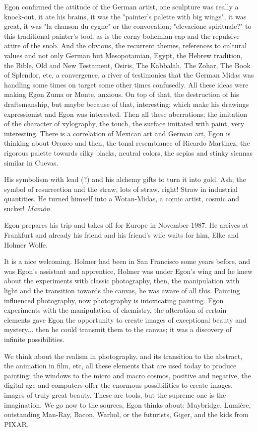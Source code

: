 \documentclass[smalldemyvopaper,11pt,twoside,onecolumn,openright,extrafontsizes]{memoir}
\begin{document}
Egon confirmed the attitude of the German artist, one sculpture was really a knock-out, it ate his brains, it was the "painter’s palette with big wings", it was great, it was "la chanson du cygne" or the convocation; "elevacione spirituale?" to this traditional painter’s tool, as is the corny bohemian cap and the repulsive attire of the snob. And the obvious, the recurrent themes, references to cultural values and not only German but Mesopotamian, Egypt, the Hebrew tradition, the Bible, Old and New Testament, Osiris, The Kabbalah, The Zohar, The Book of Splendor, etc, a convergence, a river of testimonies that the German Midas was handling some times on target some other times confusedly. All these ideas were making Egon Zuma or Monte, anxious. On top of that, the destruction of his draftsmanship, but maybe because of that, interesting; which make his drawings expressionist and Egon was interested. Then all these aberrations; the imitation of the character of xylography, the touch, the surface imitated with paint, very interesting. There is a correlation of Mexican art and German art, Egon is thinking about Orozco and then, the tonal resemblance of Ricardo Martinez, the rigorous palette towards silky blacks, neutral colors, the sepias and stinky siennas similar in Cuevas.

His symbolism with lead (?) and his alchemy gifts to turn it into gold. Ash; the symbol of resurrection and the straw, lots of straw, right! Straw in industrial quantities. He turned himself into a Wotan-Midas, a comic artist, cosmic and sucker! \textit{Mamón}.

Egon prepares his trip and takes off for Europe in November 1987. He arrives at Frankfurt and already his friend and his friend’s wife waits for him, Elke and Holmer Wolfe.

It is a nice welcoming. Holmer had been in San Francisco some years before, and was Egon’s assistant and apprentice, Holmer was under Egon’s wing and he knew about the experiments with classic photography, then, the manipulation with light and the transition towards the canvas, he was aware of all this. Painting influenced photography, now photography is intoxicating painting. Egon experiments with the manipulation of chemistry, the alteration of certain elements gave Egon the opportunity to create images of exceptional beauty and mystery... then he could transmit them to the canvas; it was a discovery of infinite possibilities.

We think about the realism in photography, and its transition to the abstract, the animation in film, etc, all these elements that are used today to produce painting: the windows to the micro and macro cosmos, positive and negative, the digital age and computers offer the enormous possibilities to create images, images of truly great beauty. These are tools, but the supreme one is the imagination. We go now to the sources, Egon thinks about: Muybridge, Lumiére, outstanding Man-Ray, Bacon, Warhol, or the futurists, Giger, and the kids from PIXAR. 
\end{document}

